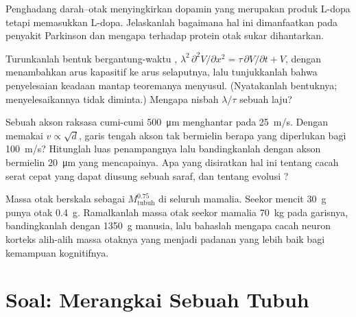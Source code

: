 \begin{exercise}[$\star\star$]\label{exo:b3:nervous-systems:9}
Penghadang darah--otak menyingkirkan dopamin yang merupakan produk L-dopa tetapi
memasukkan L-dopa. Jelaskanlah bagaimana hal ini dimanfaatkan pada penyakit
Parkinson dan mengapa  terhadap protein otak sukar dihantarkan.
\end{exercise}

\begin{exercise}[$\star\star\star$]\label{exo:b3:nervous-systems:10}
Turunkanlah bentuk bergantung-waktu , $\lambda^{2}\,\partial^{2}
V/\partial x^{2} = \tau\,\partial V/\partial t + V$, dengan menambahkan
arus kapasitif ke arus selaputnya, lalu tunjukkanlah bahwa
penyelesaian keadaan mantap teoremanya menyusul. (Nyatakanlah bentuknya;
menyelesaikannya tidak diminta.) Mengapa nisbah $\lambda/\tau$ sebuah laju?
\end{exercise}

\begin{exercise}[$\star\star\star$]\label{exo:b3:nervous-systems:11}
Sebuah akson raksasa cumi-cumi \qty{500}{\micro m} menghantar pada \qty{25}{m/s}.
Dengan memakai $v \propto \sqrt{d}$, garis tengah akson tak bermielin berapa yang
diperlukan bagi \qty{100}{m/s}? Hitunglah luas penampangnya lalu bandingkanlah
dengan akson bermielin \qty{20}{\micro m} yang mencapainya. Apa yang
disiratkan hal ini tentang cacah serat cepat yang dapat diusung sebuah saraf, dan tentang
evolusi ?
\end{exercise}

\begin{exercise}[$\star\star\star$]\label{exo:b3:nervous-systems:12}
Massa otak berskala sebagai $M_{\text{tubuh}}^{0.75}$ di seluruh mamalia. Seekor
mencit \qty{30}{g} punya otak \qty{0.4}{g}. Ramalkanlah massa otak seekor
mamalia \qty{70}{kg} pada garisnya, bandingkanlah dengan \qty{1350}{g} manusia,
lalu bahaslah mengapa cacah neuron korteks alih-alih massa otaknya yang menjadi
padanan yang lebih baik bagi kemampuan kognitifnya.
\end{exercise}

\section{Soal: Merangkai Sebuah Tubuh}

